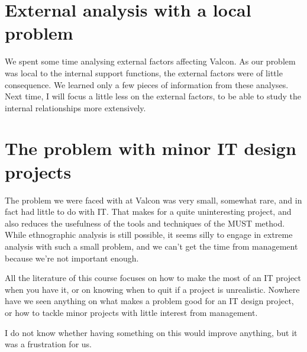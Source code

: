 \section{External analysis with a local problem}
We spent some time analysing external factors affecting Valcon.
As our problem was local to the internal support functions, the external factors were of little consequence.
We learned only a few pieces of information from these analyses.
Next time, I will focus a little less on the external factors, to be able to study the internal relationships more extensively.

\section{The problem with minor IT design projects}
The problem we were faced with at Valcon was very small, somewhat rare, and in fact had little to do with IT.
That makes for a quite uninteresting project, and also reduces the usefulness of the tools and techniques of the MUST method.
While ethnographic analysis is still possible, it seems silly to engage in extreme analysis with such a small problem, and we can't get the time from management because we're not important enough.

All the literature of this course focuses on how to make the most of an IT project when you have it, or on knowing when to quit if a project is unrealistic.
Nowhere have we seen anything on what makes a problem good for an IT design project, or how to tackle minor projects with little interest from management.

I do not know whether having something on this would improve anything, but it was a frustration for us.